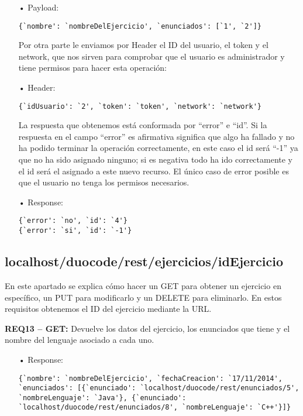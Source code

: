 \begin{itemize}
\item[•]
Payload: 
{\codesize
\begin{verbatim}
{`nombre': `nombreDelEjercicio', `enunciados': [`1', `2']}
\end{verbatim}
}

Por otra parte le enviamos por Header el ID del usuario, el token y el network, que nos sirven para comprobar que el usuario es administrador y tiene permisos para hacer esta operación:

\item[•]
Header: 
{\codesize
\begin{verbatim}
{`idUsuario': `2', `token': `token', `network': `network'}
\end{verbatim}
}

La respuesta que obtenemos está conformada por ``error'' e ``id''. Si la respuesta en el campo ``error'' es afirmativa significa que algo ha fallado y no ha podido terminar la operación correctamente, en este caso el id será ``-1'' ya que no ha sido asignado ninguno; si es negativa todo ha ido correctamente y el id será el asignado a este nuevo recurso. El único caso de error posible es que el usuario no tenga los permisos necesarios.

\item[•]
Response: 
{\codesize
\begin{verbatim}
{`error': `no', `id': `4'}
{`error': `si', `id': `-1'}
\end{verbatim}
}
\end{itemize}

\subsection{localhost/duocode/rest/ejercicios/idEjercicio}
En este apartado se explica cómo hacer un GET para obtener un ejercicio en específico, un PUT para modificarlo y un DELETE para eliminarlo.
En estos requisitos obtenemos el ID del ejercicio mediante la URL.
\vspace{1em}

\textbf{REQ13 – GET:} Devuelve los datos del ejercicio, los enunciados que tiene y el nombre del lenguaje asociado a cada uno.

\begin{itemize}
\item[•]
Response: 
{\codesize
\begin{verbatim}
{`nombre': `nombreDelEjercicio', `fechaCreacion': `17/11/2014', 
`enunciados': [{`enunciado': `localhost/duocode/rest/enunciados/5', 
`nombreLenguaje': `Java'}, {`enunciado': 
`localhost/duocode/rest/enunciados/8', `nombreLenguaje': `C++'}]}
\end{verbatim}
}
\end{itemize}

